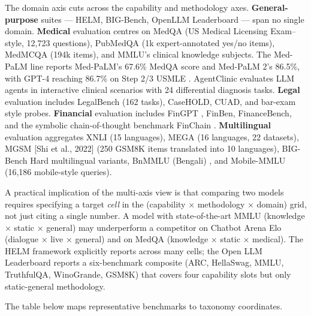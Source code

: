 \documentclass{article}
\begin{document}
The domain axis cuts across the capability and methodology axes. \textbf{General-purpose} suites --- HELM, BIG-Bench, OpenLLM Leaderboard --- span no single domain. \textbf{Medical} evaluation centres on MedQA (US Medical Licensing Exam--style, 12,723 questions), PubMedQA (1k expert-annotated yes/no items), MedMCQA (194k items), and MMLU's clinical knowledge subjects. The Med-PaLM line \cite{singhal20232023,singhal20252025} reports Med-PaLM's 67.6\% MedQA score and Med-PaLM 2's 86.5\%, with GPT-4 reaching 86.7\% on Step 2/3 USMLE \cite{nori2023capabilitiesofgpt4}. AgentClinic \cite{schmidgall20262026} evaluates LLM agents in interactive clinical scenarios with 24 differential diagnosis tasks. \textbf{Legal} evaluation includes LegalBench (162 tasks), CaseHOLD, CUAD, and bar-exam style probes. \textbf{Financial} evaluation includes FinGPT \cite{wang20232023}, FinBen, FinanceBench, and the symbolic chain-of-thought benchmark FinChain \cite{xie20252025}. \textbf{Multilingual} evaluation aggregates XNLI \cite{conneau20182018} (15 languages), MEGA \cite{ahuja20232023} (16 languages, 22 datasets), MGSM {[}Shi et al., 2022{]} (250 GSM8K items translated into 10 languages), BIG-Bench Hard multilingual variants, BnMMLU (Bengali) \cite{joy2025bnmmlumeasuringmas}, and Mobile-MMLU \cite{bsharat20252025} (16,186 mobile-style queries).

A practical implication of the multi-axis view is that comparing two models requires specifying a target \emph{cell} in the (capability × methodology × domain) grid, not just citing a single number. A model with state-of-the-art MMLU (knowledge × static × general) may underperform a competitor on Chatbot Arena Elo (dialogue × live × general) and on MedQA (knowledge × static × medical). The HELM framework \cite{liang20222022} explicitly reports across many cells; the Open LLM Leaderboard reports a six-benchmark composite (ARC, HellaSwag, MMLU, TruthfulQA, WinoGrande, GSM8K) that covers four capability slots but only static-general methodology.

The table below maps representative benchmarks to taxonomy coordinates.
\end{document}
